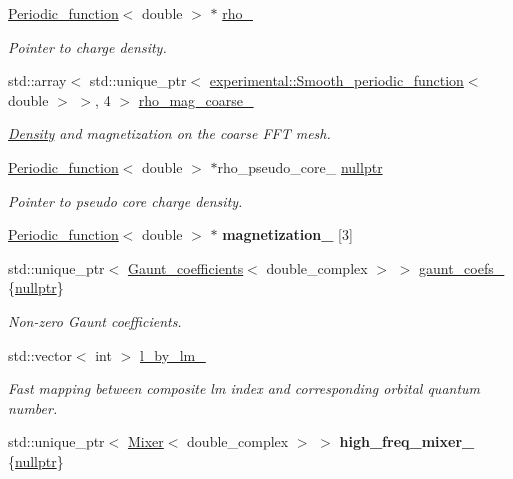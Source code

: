 \begin{DoxyCompactItemize}
\item 
\hyperlink{classsirius_1_1_periodic__function}{Periodic\+\_\+function}$<$ double $>$ $\ast$ \hyperlink{classsirius_1_1_density_abc158fb9460608eb1d4c07775e0726f0}{rho\+\_\+}
\begin{DoxyCompactList}\small\item\em Pointer to charge density. \end{DoxyCompactList}\item 
std\+::array$<$ std\+::unique\+\_\+ptr$<$ \hyperlink{classsirius_1_1experimental_1_1_smooth__periodic__function}{experimental\+::\+Smooth\+\_\+periodic\+\_\+function}$<$ double $>$ $>$, 4 $>$ \hyperlink{classsirius_1_1_density_af4aa8524e5c20a5dcac6f178daa368aa}{rho\+\_\+mag\+\_\+coarse\+\_\+}
\begin{DoxyCompactList}\small\item\em \hyperlink{classsirius_1_1_density}{Density} and magnetization on the coarse F\+F\+T mesh. \end{DoxyCompactList}\item 
\hyperlink{classsirius_1_1_periodic__function}{Periodic\+\_\+function}$<$ double $>$ $\ast$rho\+\_\+pseudo\+\_\+core\+\_\+ \hyperlink{classsirius_1_1_density_af12e5c3f7ce7767fa506e0bbd169ade3}{nullptr}
\begin{DoxyCompactList}\small\item\em Pointer to pseudo core charge density. \end{DoxyCompactList}\item 
\hypertarget{classsirius_1_1_density_a6f112457e595438482ef91ad589017e1}{}\hyperlink{classsirius_1_1_periodic__function}{Periodic\+\_\+function}$<$ double $>$ $\ast$ {\bfseries magnetization\+\_\+} \mbox{[}3\mbox{]}\label{classsirius_1_1_density_a6f112457e595438482ef91ad589017e1}

\item 
std\+::unique\+\_\+ptr$<$ \hyperlink{classsirius_1_1_gaunt__coefficients}{Gaunt\+\_\+coefficients}$<$ double\+\_\+complex $>$ $>$ \hyperlink{classsirius_1_1_density_acee7a0147e974ac60cedc82d903f70d4}{gaunt\+\_\+coefs\+\_\+} \{\hyperlink{classsirius_1_1_density_af12e5c3f7ce7767fa506e0bbd169ade3}{nullptr}\}
\begin{DoxyCompactList}\small\item\em Non-\/zero Gaunt coefficients. \end{DoxyCompactList}\item 
std\+::vector$<$ int $>$ \hyperlink{classsirius_1_1_density_ade06e0d3019316f0cf544a5bc2303776}{l\+\_\+by\+\_\+lm\+\_\+}
\begin{DoxyCompactList}\small\item\em Fast mapping between composite lm index and corresponding orbital quantum number. \end{DoxyCompactList}\item 
\hypertarget{classsirius_1_1_density_a64370cd7cb88f19313105ed56cc04699}{}std\+::unique\+\_\+ptr$<$ \hyperlink{classsirius_1_1_mixer}{Mixer}$<$ double\+\_\+complex $>$ $>$ {\bfseries high\+\_\+freq\+\_\+mixer\+\_\+} \{\hyperlink{classsirius_1_1_density_af12e5c3f7ce7767fa506e0bbd169ade3}{nullptr}\}\label{classsirius_1_1_density_a64370cd7cb88f19313105ed56cc04699}


\end{DoxyCompactItemize}
